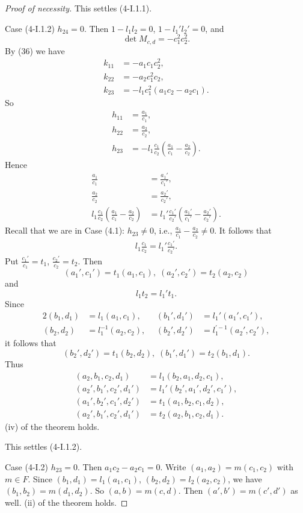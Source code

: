 \documentclass{article}
\begin{document}
\begin{proof}[Proof of necessity]
This settles (4-I.1.1).

Case (4-I.1.2)
$h_{24}=0$. Then
$1-l_1l_2=0$, $1-l_1'l_2'=0$, and
$$
\det M_{c,d}=-c_1^2c_2^2.
$$
By (36) we have 
\begin{align*}
k_{11}&=-a_1c_1c_2^2,\\
k_{22}&=-a_2c_1^2c_2,\\
k_{23}&=-l_1c_1^2(a_1c_2-a_2c_1).
\end{align*}
So
\begin{align*}
h_{11}&=\frac{a_1}{c_1},\\
h_{22}&=\frac{a_2}{c_2},\\
h_{23}&=-l_1\frac{c_1}{c_2}(\frac{a_1}{c_1}-\frac{a_2}{c_2}).
\end{align*}
Hence
\begin{align*}
\frac{a_1}{c_1}&=\frac{a_1'}{c_1'},\\
\frac{a_2}{c_2}&=\frac{a_2'}{c_2'},\\
l_1\frac{c_1}{c_2}(\frac{a_1}{c_1}-\frac{a_2}{c_2})&=
l_1'\frac{c_1'}{c_2'}(\frac{a_1'}{c_1'}-\frac{a_2'}{c_2'}).
\end{align*}
Recall that we are in Case (4.1): $h_{23}\ne 0$, i.e., $\frac{a_1}{c_1}-\frac{a_2}{c_2}\ne 0$.
It follows that
\begin{align*}
l_1\frac{c_1}{c_2}=l_1'\frac{c_1'}{c_2'}.
\end{align*}
Put
$\frac{c_1'}{c_1}=t_1$, $\frac{c_2'}{c_2}=t_2$. 
Then
$$
(a_1',c_1')=t_1(a_1,c_1), \;(a_2',c_2')=t_2(a_2,c_2)
$$
and
$$
l_1 t_2=l_1' t_1.
$$
Since
\begin{alignat*}{2}
(b_1,d_1)&=l_1(a_1,c_1), \quad & (b_1',d_1')&=l_1'(a_1',c_1'),\\
(b_2,d_2)&=l_1^{-1}(a_2,c_2), & (b_2',d_2')&=l_1^{\prime -1}(a_2',c_2'),
\end{alignat*}
it follows that
$$
(b_2',d_2')=t_1(b_2,d_2), \; (b_1',d_1')=t_2(b_1,d_1).
$$
Thus
\begin{align*}
(a_2,b_1,c_2,d_1)&=l_1(b_2,a_1,d_2,c_1),\\
(a_2',b_1',c_2',d_1')&=l_1'(b_2',a_1',d_2',c_1'),\\
(a_1',b_2',c_1',d_2')&=t_1(a_1,b_2,c_1,d_2),\\
(a_2',b_1',c_2',d_1')&=t_2(a_2,b_1,c_2,d_1).
\end{align*}
(iv) of the theorem holds.

This settles (4-I.1.2).

\medskip
Case (4-I.2) $h_{23}=0$. Then  $a_1c_2-a_2c_1=0$.
Write $(a_1,a_2)=m(c_1,c_2)$ with $m\in F$.
Since $(b_1,d_1)=l_1(a_1,c_1)$, $(b_2,d_2)=l_2(a_2,c_2)$,
we have  $(b_1,b_2)=m(d_1,d_2)$.  So
$(a,b)=m(c,d)$.
Then
$(a',b')=m(c',d')$ as well.
(ii) of the theorem holds.


\end{proof}
\end{document}
